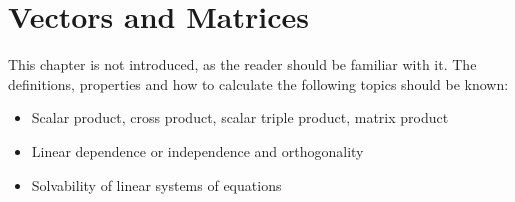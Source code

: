 \chapter{Vectors and Matrices}

This chapter is not introduced, as the reader should be familiar with it. The definitions, properties and how to calculate the following topics should be known:
\begin{itemize}
    \item Scalar product, cross product, scalar triple product, matrix product
    \item Linear dependence or independence and orthogonality
    \item Solvability of linear systems of equations
\end{itemize}